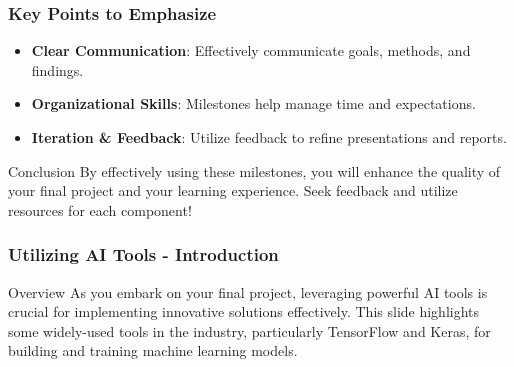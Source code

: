\documentclass[aspectratio=169]{beamer}
\begin{document}
\begin{frame}[fragile]
    \frametitle{Key Points to Emphasize}
    \begin{itemize}
        \item \textbf{Clear Communication}: Effectively communicate goals, methods, and findings.
        \item \textbf{Organizational Skills}: Milestones help manage time and expectations.
        \item \textbf{Iteration \& Feedback}: Utilize feedback to refine presentations and reports.
    \end{itemize}
    
    \begin{block}{Conclusion}
        By effectively using these milestones, you will enhance the quality of your final project and your learning experience. Seek feedback and utilize resources for each component!
    \end{block}
\end{frame}

\begin{frame}[fragile]
    \frametitle{Utilizing AI Tools - Introduction}
    \begin{block}{Overview}
        As you embark on your final project, leveraging powerful AI tools is crucial for implementing innovative solutions effectively. This slide highlights some widely-used tools in the industry, particularly TensorFlow and Keras, for building and training machine learning models.
    \end{block}
\end{frame}
\end{document}
